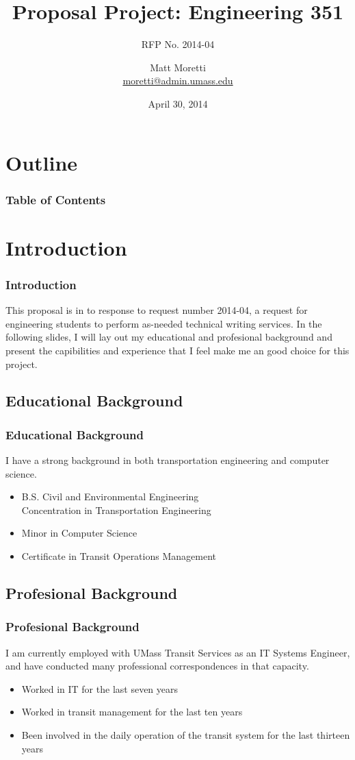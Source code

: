 \documentclass{beamer}
\title{Proposal Project: Engineering 351}
\subtitle{RFP No. 2014-04}
\author{Matt Moretti \\
\href{mailto:moretti@admin.umass.edu}%
            {moretti@admin.umass.edu}}
\institute{ENGIN 351 \\
           University of Massachusetts}
\date{April 30, 2014}
\begin{document}
\frame{\titlepage}

\section*{Outline}
\begin{frame}
  \frametitle{Table of Contents}
  \tableofcontents
\end{frame}

\section{Introduction}
\begin{frame}
  \frametitle{Introduction}
  This proposal is in to response to request number 2014-04, a request for
  engineering students to perform as-needed technical writing services.  In
  the following slides, I will lay out my educational and profesional
  background and present the capibilities and experience that I feel make me
  an good choice for this project.
\end{frame}

\subsection{Educational Background}
\begin{frame}
  \frametitle{Educational Background}

  I have a strong background in both transportation engineering and computer
  science.

  \begin{itemize}
    \item B.S. Civil and Environmental Engineering \\
      Concentration in Transportation Engineering
    \item Minor in Computer Science
    \item Certificate in Transit Operations Management
  \end{itemize}
\end{frame}

\subsection{Profesional Background}
\begin{frame}
  \frametitle{Profesional Background}

  I am currently employed with UMass Transit Services as an IT Systems Engineer,
  and have conducted many professional correspondences in that capacity.

  \begin{itemize}
    \item Worked in IT for the last seven years
    \item Worked in transit management for the last ten years
    \item Been involved in the daily operation of the transit system for the
      last thirteen years
  \end{itemize}
\end{frame}
\end{document}
